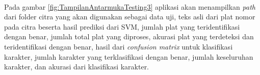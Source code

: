 \\
\noindent Pada gambar \ref{fig:TampilanAntarmukaTesting3} aplikasi akan menampilkan \textit{path} dari folder citra yang akan digunakan sebagai data uji, teks asli dari plat nomor pada citra beserta hasil prediksi dari SVM, jumlah plat yang teridentifikasi dengan benar, jumlah total plat yang diproses, akurasi plat yang terdeteksi dan teridentifikasi dengan benar, hasil dari \textit{confusion matrix} untuk klasifikasi karakter, jumlah karakter yang terklasifikasi dengan benar, jumlah keseluruhan karakter, dan akurasi dari klasifikasi karakter.\\
